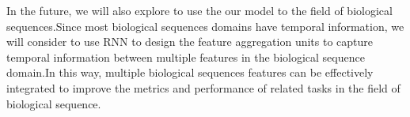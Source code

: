 \documentclass[10pt,twocolumn,letterpaper]{article}
\begin{document}
In the future, we will also explore to use the our model to the field of biological sequences.Since most biological sequences domains have temporal information, we will consider to use RNN to design the feature aggregation units to capture temporal information between multiple features in the biological sequence domain.In this way, multiple biological sequences features can be effectively integrated to improve the metrics and performance of related tasks in the field of biological sequence.

{\small


}
\end{document}
